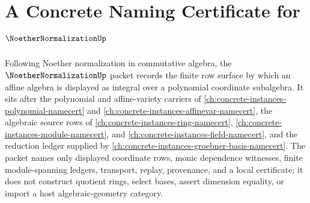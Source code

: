 \chapter{A Concrete Naming Certificate for $\NoetherNormalizationUp$}
\label{ch:concrete-instances-noether-normalization-namecert}

Following Noether normalization in commutative algebra, the $\NoetherNormalizationUp$ packet records the finite row surface by which an affine algebra is displayed as integral over a polynomial coordinate subalgebra. It sits after the polynomial and affine-variety carriers of \autoref{ch:concrete-instances-polynomial-namecert} and \autoref{ch:concrete-instances-affinevar-namecert}, the algebraic source rows of \autoref{ch:concrete-instances-ring-namecert}, \autoref{ch:concrete-instances-module-namecert}, and \autoref{ch:concrete-instances-field-namecert}, and the reduction ledger supplied by \autoref{ch:concrete-instances-groebner-basis-namecert}. The packet names only displayed coordinate rows, monic dependence witnesses, finite module-spanning ledgers, transport, replay, provenance, and a local certificate; it does not construct quotient rings, select bases, assert dimension equality, or import a host algebraic-geometry category.

